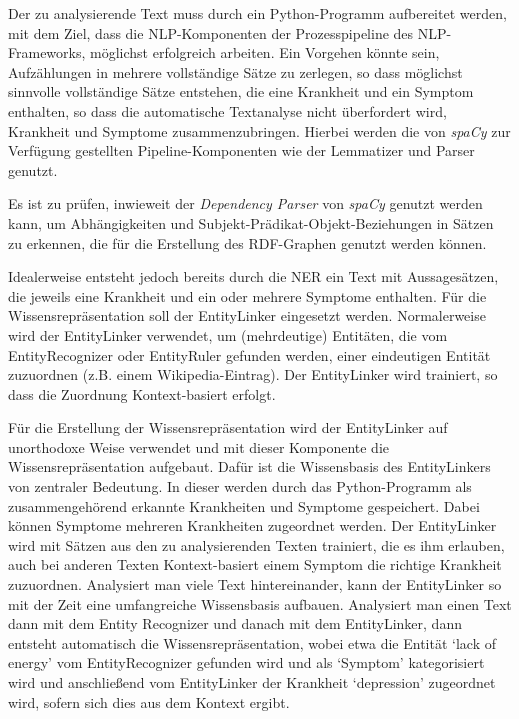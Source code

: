 Der zu analysierende Text muss durch ein Python-Programm aufbereitet werden, mit dem Ziel, dass die NLP-Komponenten der Prozesspipeline des NLP-Frameworks, möglichst erfolgreich arbeiten. Ein Vorgehen könnte sein, Aufzählungen in mehrere vollständige Sätze zu zerlegen, so dass möglichst sinnvolle vollständige Sätze entstehen, die eine Krankheit und ein Symptom enthalten, so dass die automatische Textanalyse nicht überfordert wird, Krankheit und Symptome zusammenzubringen. Hierbei werden die von \emph{spaCy} zur Verfügung gestellten Pipeline-Komponenten wie der Lemmatizer und Parser genutzt.

Es ist zu prüfen, inwieweit der \emph{Dependency Parser} von \emph{spaCy} genutzt werden kann, um Abhängigkeiten und Subjekt-Prädikat-Objekt-Beziehungen in Sätzen zu erkennen, die für die Erstellung des RDF-Graphen genutzt werden können.

Idealerweise entsteht jedoch bereits durch die NER ein Text mit Aussagesätzen, die jeweils eine Krankheit und ein oder mehrere Symptome enthalten. Für die Wissensrepräsentation soll der EntityLinker eingesetzt werden. Normalerweise wird der EntityLinker verwendet, um (mehrdeutige) Entitäten, die vom EntityRecognizer oder EntityRuler gefunden werden, einer eindeutigen Entität zuzuordnen (z.B. einem Wikipedia-Eintrag). Der EntityLinker wird trainiert, so dass die Zuordnung Kontext-basiert erfolgt.

Für die Erstellung der Wissensrepräsentation wird der EntityLinker auf unorthodoxe Weise verwendet und mit dieser Komponente die Wissensrepräsentation aufgebaut. Dafür ist die Wissensbasis des EntityLinkers von zentraler Bedeutung. In dieser werden durch das Python-Programm als zusammengehörend erkannte Krankheiten und Symptome gespeichert. Dabei können Symptome mehreren Krankheiten zugeordnet werden. Der EntityLinker wird mit Sätzen aus den zu analysierenden Texten trainiert, die es ihm erlauben, auch bei anderen Texten Kontext-basiert einem Symptom die richtige Krankheit zuzuordnen. Analysiert man viele Text hintereinander, kann der EntityLinker so mit der Zeit eine umfangreiche Wissensbasis aufbauen. Analysiert man einen Text dann mit dem Entity Recognizer und danach mit dem EntityLinker, dann entsteht automatisch die Wissensrepräsentation, wobei etwa die Entität `lack of energy' vom EntityRecognizer gefunden wird und als `Symptom' kategorisiert wird und anschließend vom EntityLinker der Krankheit `depression' zugeordnet wird, sofern sich dies aus dem Kontext ergibt.

\vspace{1cm}


